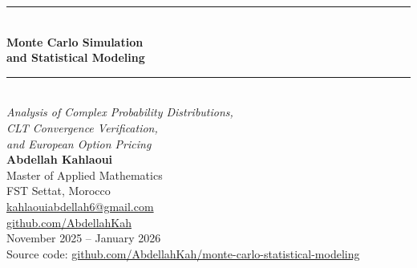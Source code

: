 \documentclass[12pt,a4paper]{article}
\begin{document}
\begin{titlepage}
  \centering\vspace*{2cm}
  {\color{primary}\rule{\linewidth}{1.5pt}}\\[0.4cm]
  {\LARGE\bfseries\color{primary}Monte Carlo Simulation\\[0.3cm]and Statistical Modeling}\\[0.4cm]
  {\color{primary}\rule{\linewidth}{1.5pt}}\\[1.5cm]
  {\large\itshape Analysis of Complex Probability Distributions,\\
    CLT Convergence Verification,\\and European Option Pricing}\\[2cm]
  {\large\textbf{Abdellah Kahlaoui}}\\[0.3cm]
  {\normalsize Master of Applied Mathematics}\\
  {\normalsize FST Settat, Morocco}\\[0.5cm]
  {\normalsize\href{mailto:kahlaouiabdellah6@gmail.com}{kahlaouiabdellah6@gmail.com}}\\
  {\normalsize\href{https://github.com/AbdellahKah}{github.com/AbdellahKah}}\\[2cm]
  {\normalsize November 2025 -- January 2026}\\[1.5cm]
  \vfill
  {\small\color{gray}Source code: \href{https://github.com/AbdellahKah/monte-carlo-statistical-modeling}{github.com/AbdellahKah/monte-carlo-statistical-modeling}}
\end{titlepage}

\begin{abstract}
\noindent
This report presents a comprehensive Monte Carlo simulation study of four canonical probability
distributions: Normal, Log-Normal, Exponential, and Poisson. We develop a vectorized simulation
engine in Python capable of generating $10^6$ independent paths per distribution in under one
second. Empirical moments are validated against closed-form theoretical values, and goodness-of-fit
is assessed via Kolmogorov-Smirnov and chi-squared tests. We experimentally confirm the convergence
rate predicted by the Central Limit Theorem, measuring log-log slopes between $-0.487$ and $-0.509$
across all distributions. Finally, we apply the Monte Carlo method to the pricing of a European call
option under Black-Scholes assumptions, achieving a price estimate of $10.4284$ against the
analytical value of $10.4506$, a relative error below $0.3\%$ at $n=10^6$ paths.
\end{abstract}
\end{document}
